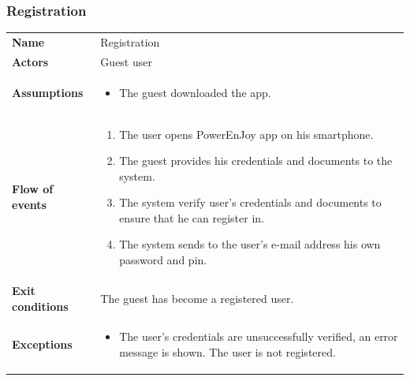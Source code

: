 \documentclass[english]{article}
\begin{document}
		\subsubsection{Registration}
		\begin{center}
		\begin{tabular}{l||p{10cm}}
		\textbf{Name} 
			& Registration\\ [8px]
		\textbf{Actors} 
			& Guest user\\ [8px]
		\textbf{Assumptions} 
			& \begin{itemize}
				\item The guest downloaded the app.
			\end{itemize}\\
		\textbf{Flow of events}
			& \begin{enumerate}
	 			\item The user opens PowerEnJoy app on his smartphone.
				\item The guest provides his credentials and documents to the system.
				\item The system verify user's credentials and documents to ensure that he can register in.
				\item The system sends to the user's e-mail address his own password and pin.
			\end{enumerate}\\ 
		\textbf{Exit conditions}
			& The guest has become a registered user.\\ [8px]
		\textbf{Exceptions}
			& \begin{itemize}
				\item The user's credentials are unsuccessfully verified, an error message is shown. The user is not registered.
			\end{itemize}
		\end{tabular}
		\end{center}
	
		\vspace*{\fill}
		\noindent
\end{document}
